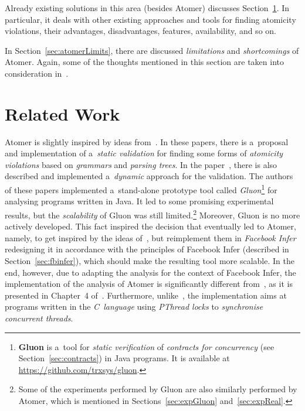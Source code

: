 Already existing solutions in this area (besides Atomer)
discusses Section~\ref{sec:atomerRelatedWork}. In particular, it deals with other existing
approaches and tools for finding atomicity violations, their advantages,
disadvantages, features, availability, and so on.

In Section~\ref{sec:atomerLimits}, there are discussed \emph{limitations} and
\emph{shortcomings} of Atomer. Again, some of the thoughts mentioned in this
section are taken into consideration in~\cite{harmimBP, excel2021Harmim}.


\section{Related Work}
\label{sec:atomerRelatedWork}

Atomer is slightly inspired by ideas from~\cite{contracts2017, contracts2015}.
In these papers, there is a~proposal and implementation of a~\emph{static
validation} for finding some forms of \emph{atomicity violations} based on
\emph{grammars} and \emph{parsing trees}. In the paper~\cite{contracts2017},
there is also described and implemented a~\emph{dynamic} approach for the
validation. The authors of these papers implemented a~stand-alone prototype
tool called \emph{Gluon}\footnote{\textbf{Gluon} is a~tool for \emph{static
verification} of \emph{contracts for concurrency}
(see Section~\ref{sec:contracts}) in Java programs. It is available at
\url{https://github.com/trxsys/gluon}.} for analysing programs written in Java.
It led to some promising experimental results, but the \emph{scalability} of
Gluon was still limited.\footnote{Some of the experiments performed by Gluon
are also similarly performed by Atomer, which is mentioned in
Sections~\ref{sec:expGluon} and~\ref{sec:expReal}.} Moreover, Gluon is no more
actively developed. This fact inspired the decision that eventually led to
Atomer, namely, to get inspired by the ideas of~\cite{contracts2017,
contracts2015}, but reimplement them in \emph{Facebook Infer} redesigning it
in accordance with the principles of Facebook Infer (described in
Section~\ref{sec:fbinfer}), which should make the resulting tool more
scalable. In the end, however, due to adapting the analysis for the context
of Facebook Infer, the implementation of the analysis of Atomer is
significantly different from~\cite{contracts2017, contracts2015}, as it is
presented in Chapter~4 of~\cite{harmimBP}. Furthermore,
unlike~\cite{contracts2017, contracts2015}, the implementation aims at
programs written in the \emph{C~language} using \emph{PThread locks} to
\emph{synchronise concurrent threads}.

